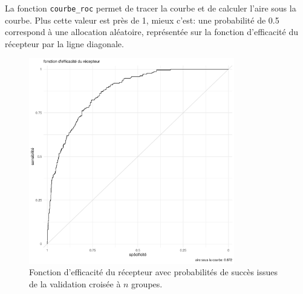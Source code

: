 \documentclass[
  11pt,
  letterpaper,
]{scrbook}
\newenvironment{Shaded}{\begin{snugshade}}{\end{snugshade}}
\newcommand{\AttributeTok}[1]{\textcolor[rgb]{0.40,0.45,0.13}{#1}}
\newcommand{\CommentTok}[1]{\textcolor[rgb]{0.37,0.37,0.37}{#1}}
\newcommand{\ConstantTok}[1]{\textcolor[rgb]{0.56,0.35,0.01}{#1}}
\newcommand{\DocumentationTok}[1]{\textcolor[rgb]{0.37,0.37,0.37}{\textit{#1}}}
\newcommand{\FunctionTok}[1]{\textcolor[rgb]{0.28,0.35,0.67}{#1}}
\newcommand{\NormalTok}[1]{\textcolor[rgb]{0.00,0.23,0.31}{#1}}
\newcommand{\OtherTok}[1]{\textcolor[rgb]{0.00,0.23,0.31}{#1}}
\newcommand{\SpecialCharTok}[1]{\textcolor[rgb]{0.37,0.37,0.37}{#1}}
\theoremstyle{definition}
\theoremstyle{remark}
\begin{document}
La fonction \texttt{courbe\_roc} permet de tracer la courbe et de
calculer l'aire sous la courbe. Plus cette valeur est près de 1, mieux
c'est: une probabilité de 0.5 correspond à une allocation aléatoire,
représentée sur la fonction d'efficacité du récepteur par la ligne
diagonale.

\begin{figure}[ht!]

{\centering \includegraphics[width=0.8\textwidth,height=\textheight]{reglogistique_files/figure-pdf/fig-roccurve-1.pdf}

}

\caption{\label{fig-roccurve}Fonction d'efficacité du récepteur avec
probabilités de succès issues de la validation croisée à \(n\) groupes.}

\end{figure}

\begin{Shaded}
\end{Shaded}
\end{document}
